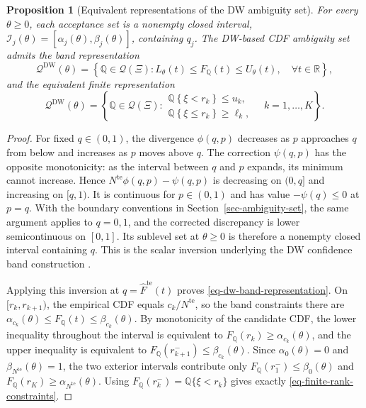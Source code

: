 \documentclass[review,11pt,3p,authoryear,nopreprintline]{elsarticle}
\newtheorem{proposition}{Proposition}
\begin{document}
\begin{proposition}[Equivalent representations of the DW ambiguity set]
  \label{prop-finite-rank-constraints}
  For every $\theta\ge0$, each acceptance set is a nonempty closed interval,
  $\mathcal I_j(\theta)=[\alpha_j(\theta),\beta_j(\theta)]$, containing $q_j$. The DW-based CDF ambiguity set admits the band representation
  \begin{equation}
    \mathscr Q^{\mathrm{DW}}(\theta)=
    \left\{\mathbb Q\in\mathcal Q(\Xi):
    L_\theta(t)\le F_{\mathbb Q}(t)\le U_\theta(t),\quad\forall t\in\mathbb R\right\},
    \label{eq-dw-band-representation}
  \end{equation}
  and the equivalent finite representation
  \begin{equation}
    \mathscr Q^{\mathrm{DW}}(\theta)=
    \left\{\mathbb Q\in\mathcal Q(\Xi):
    \begin{array}{ll}
      \mathbb Q\left\{\xi<r_k\right\}\le u_k,\\
      \mathbb Q\left\{\xi\le r_k\right\}\ge\ell_k,
    \end{array}
    \quad k=1,\ldots,K\right\}.
    \label{eq-finite-rank-constraints}
  \end{equation}
\end{proposition}
\begin{proof}
  For fixed $q\in(0,1)$, the divergence $\phi(q,p)$ decreases as $p$ approaches $q$ from below and increases as $p$ moves above $q$. The correction $\psi(q,p)$ has the opposite monotonicity: as the interval between $q$ and $p$ expands, its minimum cannot increase. Hence $N^{\mathrm{te}}\phi(q,p)-\psi(q,p)$ is decreasing on $(0,q]$ and increasing on $[q,1)$. It is continuous for $p\in(0,1)$ and has value $-\psi(q)\le0$ at $p=q$. With the boundary conventions in Section~\ref{sec-ambiguity-set}, the same argument applies to $q=0,1$, and the corrected discrepancy is lower semicontinuous on $[0,1]$. Its sublevel set at $\theta\ge0$ is therefore a nonempty closed interval containing $q$. This is the scalar inversion underlying the DW confidence band construction \citep[Supplement, Section~S.6]{L.J23}.

  Applying this inversion at $q=\widehat F^{\mathrm{te}}(t)$ proves \eqref{eq-dw-band-representation}. On $[r_k,r_{k+1})$, the empirical CDF equals $c_k/N^{\mathrm{te}}$, so the band constraints there are
  $\alpha_{c_k}(\theta)\le F_{\mathbb Q}(t)\le\beta_{c_k}(\theta)$.
  By monotonicity of the candidate CDF, the lower inequality throughout the interval is equivalent to
  $F_{\mathbb Q}(r_k)\ge\alpha_{c_k}(\theta)$, and the upper inequality is equivalent to
  $F_{\mathbb Q}(r_{k+1}^-)\le\beta_{c_k}(\theta)$.
  Since $\alpha_0(\theta)=0$ and $\beta_{N^{\mathrm{te}}}(\theta)=1$, the two exterior intervals contribute only
  $F_{\mathbb Q}(r_1^-)\le\beta_0(\theta)$ and
  $F_{\mathbb Q}(r_K)\ge\alpha_{N^{\mathrm{te}}}(\theta)$.
  Using $F_{\mathbb Q}(r_k^-)=\mathbb Q\{\xi<r_k\}$ gives exactly \eqref{eq-finite-rank-constraints}.
\end{proof}
\end{document}
